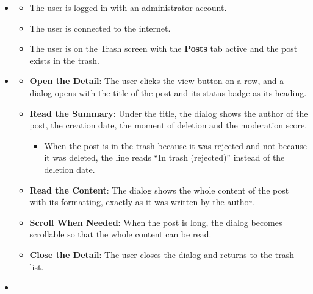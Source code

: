 \begin{itemize}[leftmargin=1.6em,topsep=4pt,itemsep=3pt,parsep=0pt,label=$\bullet$]
    \item {}
        \begin{itemize}[leftmargin=2.2em,topsep=2pt,itemsep=3pt,parsep=0pt,label=$\circ$]
            \item The user is logged in with an administrator account.
            \item The user is connected to the internet.
            \item The user is on the Trash screen with the \textbf{Posts} tab active and the post exists in the trash.
        \end{itemize}
    \item {}
        \begin{itemize}[leftmargin=2.2em,topsep=2pt,itemsep=3pt,parsep=0pt,label=$\circ$]
            \item \textbf{Open the Detail}: The user clicks the view button on a row, and a dialog opens with the title of the post and its status badge as its heading.
            \item \textbf{Read the Summary}: Under the title, the dialog shows the author of the post, the creation date, the moment of deletion and the moderation score.
                \begin{itemize}[leftmargin=2.2em,topsep=2pt,itemsep=3pt,parsep=0pt,label=$\blacksquare$]
                    \item When the post is in the trash because it was rejected and not because it was deleted, the line reads ``In trash (rejected)'' instead of the deletion date.
                \end{itemize}
            \item \textbf{Read the Content}: The dialog shows the whole content of the post with its formatting, exactly as it was written by the author.
            \item \textbf{Scroll When Needed}: When the post is long, the dialog becomes scrollable so that the whole content can be read.
            \item \textbf{Close the Detail}: The user closes the dialog and returns to the trash list.
        \end{itemize}
    \item {}
        \begin{itemize}[leftmargin=2.2em,topsep=2pt,itemsep=3pt,parsep=0pt,label=$\circ$]

\end{itemize}
\end{itemize}
